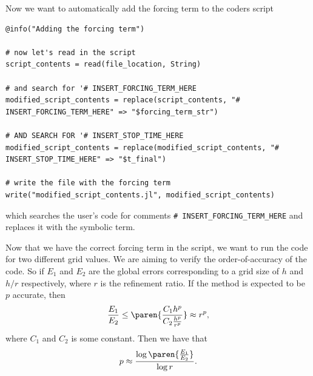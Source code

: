 \documentclass[12pt]{report}
\begin{document}
Now we want to automatically add the forcing term to the coders script
\begin{lstlisting}
@info("Adding the forcing term")

# now let's read in the script
script_contents = read(file_location, String)

# and search for '# INSERT_FORCING_TERM_HERE
modified_script_contents = replace(script_contents, "# INSERT_FORCING_TERM_HERE" => "$forcing_term_str")

# AND SEARCH FOR '# INSERT_STOP_TIME_HERE
modified_script_contents = replace(modified_script_contents, "# INSERT_STOP_TIME_HERE" => "$t_final")

# write the file with the forcing term
write("modified_script_contents.jl", modified_script_contents)
\end{lstlisting}
which searches the user's code for comments \verb+# INSERT_FORCING_TERM_HERE+ and replaces it with the symbolic term.

Now that we have the correct forcing term in the script, we want to run the code for two different grid values. We are aiming to verify the order-of-accuracy of the code. So if $E_1$ and $E_2$ are the global errors corresponding to a grid size of $h$ and $h/r$ respectively, where $r$ is the refinement ratio. If the method is expected to be $p$ accurate, then 
\begin{equation*}
    \frac{E_1}{E_2} \leq \paren{\frac{C_1 h^p}{C_2 \frac{h^p}{r^p}}} \approx r^p,
\end{equation*}
where $C_1$ and $C_2$ is some constant. Then we have that
\begin{equation*}
    p \approx \frac{\log{\paren{\frac{E_1}{E_2}}}}{\log{r}}.
\end{equation*}
\end{document}
